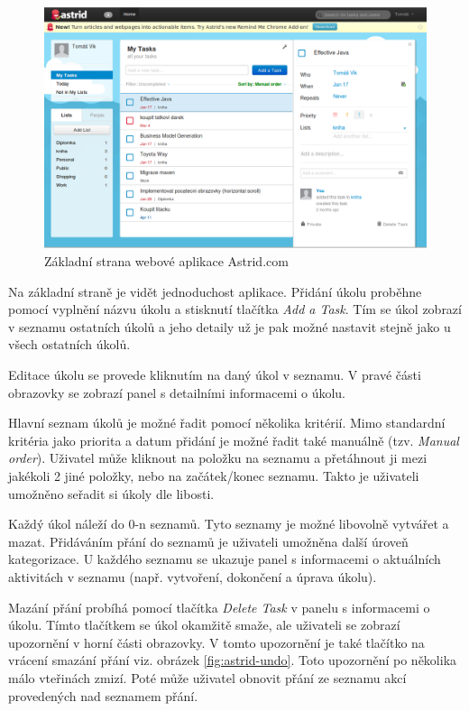 \begin{figure}[htb]
\begin{center}
\includegraphics[width=130mm]{./pictures/astrid.png}
\caption{Základní strana webové aplikace Astrid.com}
\label{fig:astrid}
\end{center}
\end{figure}

Na základní straně je vidět jednoduchost aplikace. Přidání úkolu proběhne pomocí vyplnění názvu úkolu a stisknutí tlačítka \emph{Add a Task}. Tím se úkol zobrazí v seznamu ostatních úkolů a jeho detaily už je pak možné nastavit stejně jako u všech ostatních úkolů.

Editace úkolu se provede kliknutím na daný úkol v seznamu. V pravé části obrazovky se zobrazí panel s detailními informacemi o úkolu.

Hlavní seznam úkolů je možné řadit pomocí několika kritérií. Mimo standardní kritéria jako priorita a datum přidání je možné řadit také manuálně (tzv. \emph{Manual order}). Uživatel může kliknout na položku na seznamu a přetáhnout ji mezi jakékoli 2 jiné položky, nebo na začátek/konec seznamu. Takto je uživateli umožněno seřadit si úkoly dle libosti.

Každý úkol náleží do 0-n seznamů. Tyto seznamy je možné libovolně vytvářet a mazat. Přidáváním přání do seznamů je uživateli umožněna další úroveň kategorizace. U každého seznamu se ukazuje panel s informacemi o aktuálních aktivitách v seznamu (např. vytvoření, dokončení a úprava úkolu).

Mazání přání probíhá pomocí tlačítka \emph{Delete Task} v panelu s informacemi o úkolu. Tímto tlačítkem se úkol okamžitě smaže, ale uživateli se zobrazí upozornění v horní části obrazovky. V tomto upozornění je také tlačítko na vrácení smazání přání viz. obrázek \ref{fig:astrid-undo}. Toto upozornění po několika málo vteřinách zmizí. Poté může uživatel obnovit přání ze seznamu akcí provedených nad seznamem přání.


